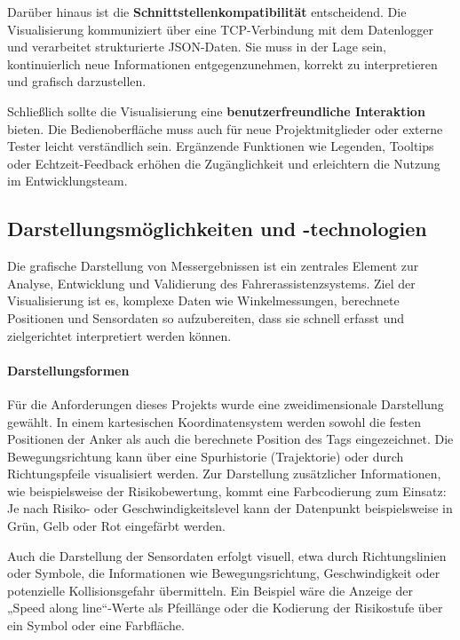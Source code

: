 \documentclass[a4paper, 12pt]{article} %
\begin{document}
Darüber hinaus ist die \textbf{Schnittstellenkompatibilität} entscheidend. Die Visualisierung kommuniziert über eine TCP-Verbindung mit dem Datenlogger 
und verarbeitet strukturierte JSON-Daten. Sie muss in der Lage sein, kontinuierlich neue Informationen entgegenzunehmen, korrekt zu interpretieren und 
grafisch darzustellen.

Schließlich sollte die Visualisierung eine \textbf{benutzerfreundliche Interaktion} bieten. Die Bedienoberfläche muss auch für neue Projektmitglieder
 oder externe Tester leicht verständlich sein. Ergänzende Funktionen wie Legenden, Tooltips oder Echtzeit-Feedback erhöhen die Zugänglichkeit und 
 erleichtern die Nutzung im Entwicklungsteam.

\subsection{Darstellungsmöglichkeiten und -technologien}

Die grafische Darstellung von Messergebnissen ist ein zentrales Element zur Analyse, Entwicklung und Validierung des Fahrerassistenzsystems.
 Ziel der Visualisierung ist es, komplexe Daten wie Winkelmessungen, berechnete Positionen und Sensordaten so aufzubereiten, dass sie schnell
  erfasst und zielgerichtet interpretiert werden können.

\paragraph{Darstellungsformen}

Für die Anforderungen dieses Projekts wurde eine zweidimensionale Darstellung gewählt. In einem kartesischen Koordinatensystem werden sowohl 
die festen Positionen der Anker als auch die berechnete Position des Tags eingezeichnet. Die Bewegungsrichtung kann über eine Spurhistorie 
(Trajektorie) oder durch Richtungspfeile visualisiert werden. Zur Darstellung zusätzlicher Informationen, wie beispielsweise der Risikobewertung, 
kommt eine Farbcodierung zum Einsatz: Je nach Risiko- oder Geschwindigkeitslevel kann der Datenpunkt beispielsweise in Grün, Gelb oder Rot eingefärbt 
werden.

Auch die Darstellung der Sensordaten erfolgt visuell, etwa durch Richtungslinien oder Symbole, die Informationen wie 
Bewegungsrichtung, Geschwindigkeit oder potenzielle Kollisionsgefahr übermitteln. Ein Beispiel wäre die Anzeige der „Speed along line“-Werte als
 Pfeillänge oder die Kodierung der Risikostufe über ein Symbol oder eine Farbfläche.
\end{document}
